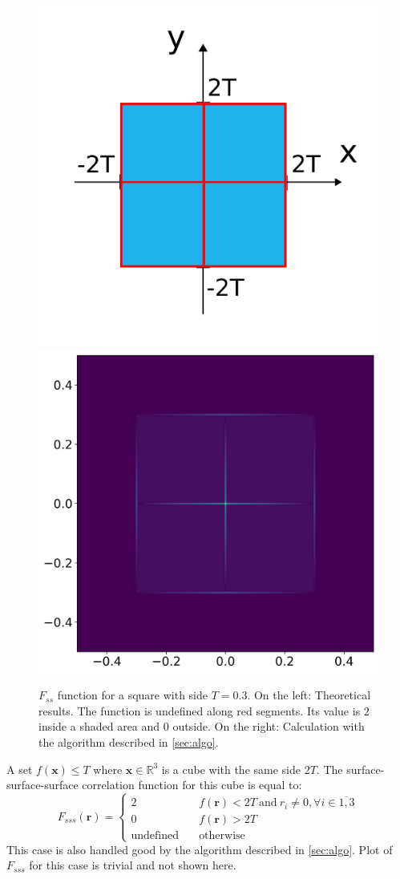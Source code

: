 \documentclass[reprint,amsmath,amssymb,aps,pre,showkeys,showpacs]{revtex4-1}
\begin{document}
\begin{figure}
  \centering
  \includegraphics[width=0.45\linewidth]{images/fss-square.png}
  \hfill
  \includegraphics[width=0.45\linewidth]{images/fss-square-julia.png}
  \caption[]{$F_{ss}$ function for a square with side $T = 0.3$. On the left:
    Theoretical results. The function is undefined along red segments. Its value
    is $2$ inside a shaded area and $0$ outside. On the right: Calculation with
    the algorithm described in \cref{sec:algo}.}
  \label{fig:fss-square}
\end{figure}

A set $f(\bm{x}) \le T$ where $\bm{x} \in \mathbb{R}^3$ is a cube with the same
side $2T$.
The surface-surface-surface correlation function for this cube is equal to:
\begin{equation*}
  F_{sss}(\bm{r}) = \left\{
  \begin{array}{ll}
    2 & \quad f(\bm{r}) < 2T \ \text{and}\ r_i \ne 0, \forall i \in \overline{1,3} \\
    0 & \quad f(\bm{r}) > 2T \\
    \text{undefined} & \quad \text{otherwise}
  \end{array}
  \right.
\end{equation*}
This case is also handled good by the algorithm described in
\cref{sec:algo}. Plot of $F_{sss}$ for this case is trivial and not shown here.
\end{document}
